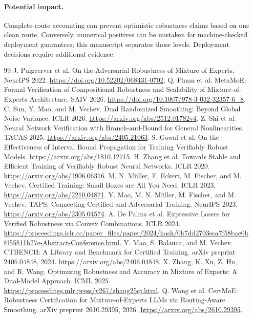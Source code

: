 \documentclass[10pt]{article}
\begin{document}
\paragraph{Potential impact.}
Complete-route accounting can prevent optimistic robustness claims based on
one clean route. Conversely, numerical positives can be mistaken for
machine-checked deployment guarantees; this manuscript separates those
levels. Deployment decisions require additional evidence.

\begin{thebibliography}{99}
 J. Puigcerver et al. On the Adversarial Robustness of Mixture
of Experts. NeurIPS 2022. \url{https://doi.org/10.52202/068431-0702}.
 Q. Pham et al. MetaMoE: Formal Verification of Compositional
Robustness and Scalability of Mixture-of-Experts Architecture. SAIV 2026.
\url{https://doi.org/10.1007/978-3-032-32357-6_8}.
 C. Sun, Y. Mao, and M. Vechev. Dual Randomized Smoothing:
Beyond Global Noise Variance. ICLR 2026.
\url{https://arxiv.org/abs/2512.01782v4}.
 Z. Shi et al. Neural Network Verification with Branch-and-Bound
for General Nonlinearities. TACAS 2025. \url{https://arxiv.org/abs/2405.21063}.
 S. Gowal et al. On the Effectiveness of Interval Bound Propagation
for Training Verifiably Robust Models. \url{https://arxiv.org/abs/1810.12715}.
 H. Zhang et al. Towards Stable and Efficient Training of
Verifiably Robust Neural Networks. ICLR 2020. \url{https://arxiv.org/abs/1906.06316}.
 M. N. M\"uller, F. Eckert, M. Fischer, and M. Vechev.
Certified Training: Small Boxes are All You Need. ICLR 2023.
\url{https://arxiv.org/abs/2210.04871}.
 Y. Mao, M. N. M\"uller, M. Fischer, and M. Vechev.
TAPS: Connecting Certified and Adversarial Training. NeurIPS 2023.
\url{https://arxiv.org/abs/2305.04574}.
 A. De Palma et al. Expressive Losses for Verified Robustness
via Convex Combinations. ICLR 2024.
\url{https://proceedings.iclr.cc/paper_files/paper/2024/hash/0b7dd2703eca7f58bae0bf455811b27e-Abstract-Conference.html}.
 Y. Mao, S. Balauca, and M. Vechev.
CTBENCH: A Library and Benchmark for Certified Training.
arXiv preprint 2406.04848, 2024. \url{https://arxiv.org/abs/2406.04848}.
 X. Zhang, K. Xu, Z. Hu, and R. Wang. Optimizing Robustness and
Accuracy in Mixture of Experts: A Dual-Model Approach. ICML 2025.
\url{https://proceedings.mlr.press/v267/zhang25cj.html}.
 Q. Wang et al. CertMoE: Robustness Certification for
Mixture-of-Experts LLMs via Routing-Aware Smoothing. arXiv preprint 2610.29395, 2026.
\url{https://arxiv.org/abs/2610.29395}.
\end{thebibliography}

\clearpage
\appendix



\end{document}
